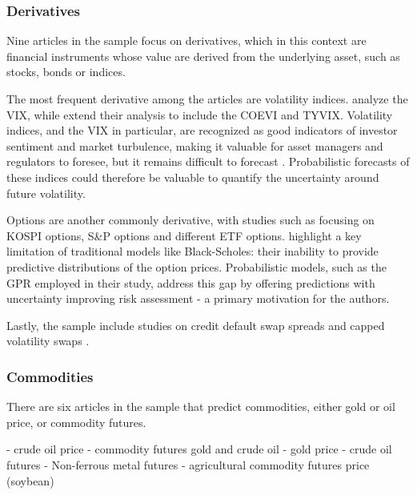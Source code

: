 \subsubsection{Derivatives}
Nine articles in the sample focus on derivatives, which in this context are financial instruments whose value are derived from the underlying asset, such as stocks, bonds or indices. 

The most frequent derivative among the articles are volatility indices. \cite{hortua2024forecasting, Daniali2021} analyze the VIX, while \cite{Tian2023} extend their analysis to include the COEVI and TYVIX. Volatility indices, and the VIX in particular, are recognized as good indicators of investor sentiment and market turbulence, making it valuable for asset managers and regulators to foresee, but it remains difficult to forecast \parencite{hortua2024forecasting}. Probabilistic forecasts  of these indices could therefore be valuable to quantify the uncertainty around future volatility.

Options are another commonly derivative, with studies such as \cite{Park2014gpr} focusing on KOSPI options, \cite{DeSpiegeleer2018gpr} S\&P options and \cite{tang2024period} different ETF options. \cite{Park2014gpr} highlight a key limitation of traditional models like Black-Scholes: their inability to provide predictive distributions of the option prices. Probabilistic models, such as the GPR employed in their study, address this gap by offering predictions with uncertainty improving risk assessment - a primary motivation for the authors. 

Lastly, the sample include studies on credit default swap spreads \parencite{Law2017Practical} and capped volatility swaps \parencite{Hocht2024gpr}. 


\subsubsection{Commodities}
There are six articles in the sample that predict commodities, either gold or oil price, or commodity futures. 









\cite{Ahmed2023Enhancing} - crude oil price
\cite{Law2017Practical} - commodity futures gold and crude oil
\cite{Wang2024GoldForecasting} - gold price
\cite{Guo2022Risk} - crude oil futures
\cite{Guo2022} - Non-ferrous metal futures
\cite{li2020multivariate} - agricultural commodity futures price (soybean)



